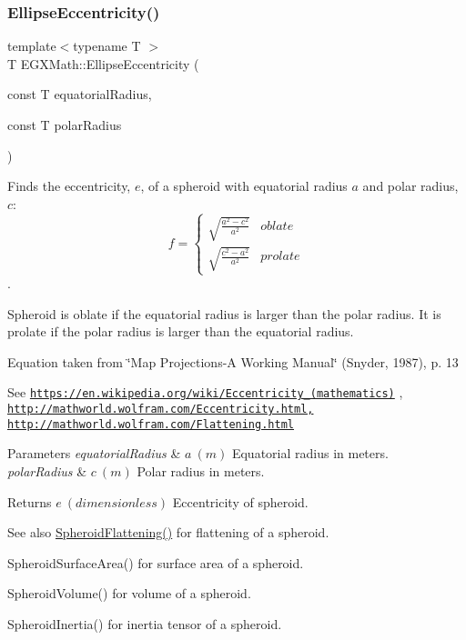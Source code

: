 \subsubsection{\texorpdfstring{Ellipse\+Eccentricity()}{EllipseEccentricity()}\hspace{0.1cm}{\footnotesize\ttfamily [2/2]}}
{\footnotesize\ttfamily template$<$typename T $>$ \\
T E\+G\+X\+Math\+::\+Ellipse\+Eccentricity (\begin{DoxyParamCaption}\item[{const T}]{equatorial\+Radius,  }\item[{const T}]{polar\+Radius }\end{DoxyParamCaption})}



Finds the eccentricity, $e$, of a spheroid with equatorial radius $a$ and polar radius, $c$\+: \[ f =\begin{cases} \sqrt{\frac{a^2-c^2}{a^2}} & oblate \\ \sqrt{\frac{c^2-a^2}{a^2}} & prolate \end{cases} \]. 

Spheroid is oblate if the equatorial radius is larger than the polar radius. It is prolate if the polar radius is larger than the equatorial radius.

Equation taken from \char`\"{}\+Map Projections-\/\+A Working Manual\char`\"{} (Snyder, 1987), p. 13

See \href{https://en.wikipedia.org/wiki/Eccentricity_(mathematics)}{\tt https\+://en.\+wikipedia.\+org/wiki/\+Eccentricity\+\_\+(mathematics)} , \href{http://mathworld.wolfram.com/Eccentricity.html,}{\tt http\+://mathworld.\+wolfram.\+com/\+Eccentricity.\+html,} \href{http://mathworld.wolfram.com/Flattening.html}{\tt http\+://mathworld.\+wolfram.\+com/\+Flattening.\+html} 
\begin{DoxyParams}{Parameters}
{\em equatorial\+Radius} & $ a\ (m)$ Equatorial radius in meters. \\
\hline
{\em polar\+Radius} & $ c\ (m)$ Polar radius in meters. \\
\hline
\end{DoxyParams}
\begin{DoxyReturn}{Returns}
$ e\ (dimensionless)$ Eccentricity of spheroid. 
\end{DoxyReturn}
\begin{DoxySeeAlso}{See also}
\mbox{\hyperlink{group___e_g_x_math-_geometry-3_d-_spheroid-_flattening_ga640f4bcd86aa4c378819bffda31c0852}{Spheroid\+Flattening()}} for flattening of a spheroid. 

Spheroid\+Surface\+Area() for surface area of a spheroid. 

Spheroid\+Volume() for volume of a spheroid. 

Spheroid\+Inertia() for inertia tensor of a spheroid. 
\end{DoxySeeAlso}
